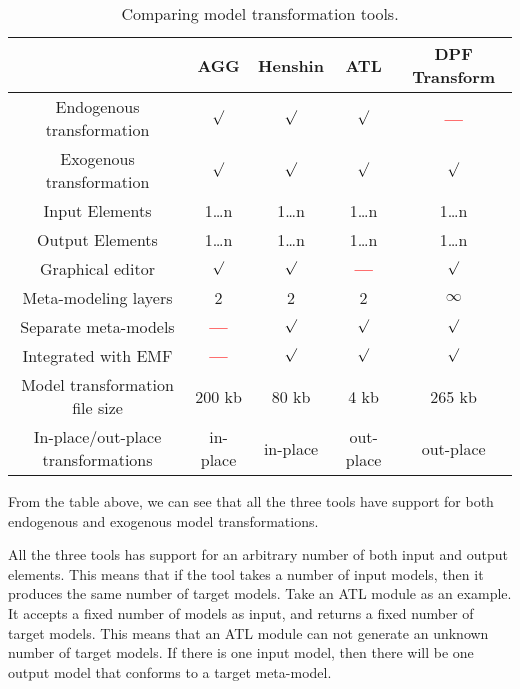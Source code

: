\begin{table}[ht]
\renewcommand*\arraystretch{1.2}
\centering
\begin{tabular}{| c | c | c | c | c |}
\hline
& AGG & Henshin & ATL & DPF Transform \\
\hline
Endogenous transformation & $\surd$ & $\surd$ & $\surd$ & \textcolor{red}{\textbf{---}}\\

Exogenous transformation & $\surd$ & $\surd$ & $\surd$ & $\surd$\\

Input Elements & 1\ldots n & 1\ldots n & 1\ldots n & 1\ldots n\\

Output Elements & 1\ldots n & 1\ldots n & 1\ldots n & 1\ldots n\\

Graphical editor & $\surd$ & $\surd$ & \textcolor{red}{\textbf{---}} & $\surd$
\\

Meta-modeling layers & 2 & 2 & 2 & $\infty$ \\

Separate meta-models & \textcolor{red}{\textbf{---}} &  $\surd$ &  $\surd$ &  $\surd$ \\

Integrated with EMF & \textcolor{red}{\textbf{---}} & $\surd$ & $\surd$ & $\surd$ \\ 

Model transformation file size & 200 kb & 80 kb & 4 kb & 265 kb\\

In-place/out-place transformations & in-place &
in-place & out-place  & out-place \\

\hline
\end{tabular}
\caption{Comparing model transformation tools.}
\label{tab:comparing}
\end{table} 



From the table above, we can see that all the three tools have support
for both endogenous and exogenous model transformations. 

All the three tools has support for an arbitrary number of both input and
output elements. This means that if the tool takes a number of input models, then it
produces the same number of target models. Take an ATL module as an example. It
accepts a fixed number of models as input, and returns a fixed number of target
models. This means that an ATL module can not generate an unknown number of
target models. If there is one input model, then there will be one output model
that conforms to a target meta-model.

